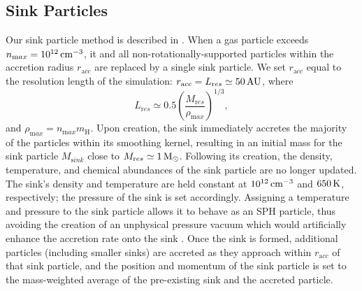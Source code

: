 \documentclass[../thesis.tex]{subfiles}
\begin{document}
\subsection{Sink Particles}
\label{sinkParticles}
Our sink particle method is described in \citet{StacyGreifBromm2010}. 
When a gas particle exceeds $n_{\mathrm max} = 10^{12}\cc$, it and all non-rotationally-supported particles within the accretion radius $r_{\mathrm acc}$ are replaced by a single sink particle.  
We set $r_{\mathrm acc}$ equal to the resolution length of the simulation: $r_{\mathrm acc} = L_{\mathrm res} \simeq 50\au$, where 
\begin{equation}
L_{\mathrm res} \simeq 0.5 \left( \frac{M_{\mathrm res}}{\rho_{\mathrm max}} \right)^{1/3},
\end{equation}
and $\rho_{\mathrm max} = n_{\mathrm max} m_{\mathrm H}$.  
Upon creation, the sink immediately accretes the majority of the particles within its smoothing kernel, resulting in an initial mass for the sink particle $M_{\mathrm sink}$ close to $M_{\mathrm res} \simeq 1\msun$.  
Following its creation, the density, temperature, and chemical abundances of the sink particle are no longer updated.  
The sink's density and temperature are held constant at $10^{12}\cc$ and $650\kelvin$, respectively; the pressure of the sink is set accordingly. 
Assigning a temperature and pressure to the sink particle allows it to behave as an SPH particle, thus avoiding the creation of an unphysical pressure vacuum which would artificially enhance the accretion rate onto the sink \citep[see][]{BrommCoppiLarson2002, MartelEvansShapiro2006}. 
Once the sink is formed, additional particles (including smaller sinks) are accreted as they approach within $r_{\mathrm acc}$ of that sink particle, and the position and momentum of the sink particle is set to the mass-weighted average of the pre-existing sink and the accreted particle.
\end{document}
